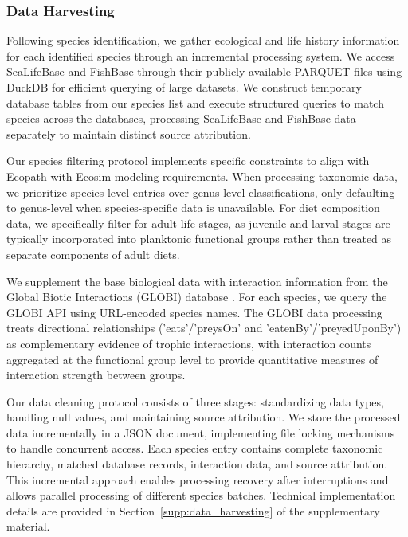\subsubsection{Data Harvesting}

Following species identification, we gather ecological and life history information for each identified species through an incremental processing system. We access SeaLifeBase and FishBase \citep{froese2010fishbase} through their publicly available PARQUET files using DuckDB for efficient querying of large datasets. We construct temporary database tables from our species list and execute structured queries to match species across the databases, processing SeaLifeBase and FishBase data separately to maintain distinct source attribution.

Our species filtering protocol implements specific constraints to align with Ecopath with Ecosim modeling requirements. When processing taxonomic data, we prioritize species-level entries over genus-level classifications, only defaulting to genus-level when species-specific data is unavailable. For diet composition data, we specifically filter for adult life stages, as juvenile and larval stages are typically incorporated into planktonic functional groups rather than treated as separate components of adult diets.

We supplement the base biological data with interaction information from the Global Biotic Interactions (GLOBI) database \citep{Poelen2014}. For each species, we query the GLOBI API using URL-encoded species names. The GLOBI data processing treats directional relationships ('eats'/'preysOn' and 'eatenBy'/'preyedUponBy') as complementary evidence of trophic interactions, with interaction counts aggregated at the functional group level to provide quantitative measures of interaction strength between groups.

Our data cleaning protocol consists of three stages: standardizing data types, handling null values, and maintaining source attribution. We store the processed data incrementally in a JSON document, implementing file locking mechanisms to handle concurrent access. Each species entry contains complete taxonomic hierarchy, matched database records, interaction data, and source attribution. This incremental approach enables processing recovery after interruptions and allows parallel processing of different species batches. Technical implementation details are provided in Section~\ref{supp:data_harvesting} of the supplementary material.
